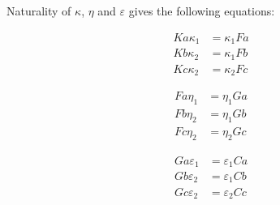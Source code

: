 \begin{example}
\noindent Naturality of $\kappa$, $\eta$ and $\varepsilon$ gives the following equations:\\
\begin{minipage}{.04\textwidth}
\phantom{}
\end{minipage}
\begin{minipage}{.28\textwidth}
\begin{subequations}
\begin{align}
Ka \kappa_{1} &=\label{eq:naturality_equations_first}
 \kappa_{1} Fa \\
Kb \kappa_{2} &= \kappa_{1} Fb \\
Kc \kappa_{2} &= \kappa_{2} Fc
\end{align}
\end{subequations}
\end{minipage}
\begin{minipage}{.04\textwidth}
\phantom{}
\end{minipage}
\begin{minipage}{.28\textwidth}
\begin{subequations}
\begin{align}
Fa \eta_{1} &= \eta_{1} Ga \\
Fb \eta_{2} &= \eta_{1} Gb \\
Fc \eta_{2} &= \eta_{2} Gc
\end{align}
\end{subequations}
\end{minipage}
\begin{minipage}{.04\textwidth}
\phantom{}
\end{minipage}
\begin{minipage}{.28\textwidth}
\begin{subequations}
\begin{align}
Ga \varepsilon_{1} &= \varepsilon_{1} Ca \\
Gb \varepsilon_{2} &= \varepsilon_{1} Cb \\
Gc \varepsilon_{2} &=\label{eq:naturality_equations_last}
 \varepsilon_{2} Cc
\end{align}
\end{subequations}
\end{minipage}
\begin{minipage}{.04\textwidth}
\phantom{}
\end{minipage}


\end{example}
